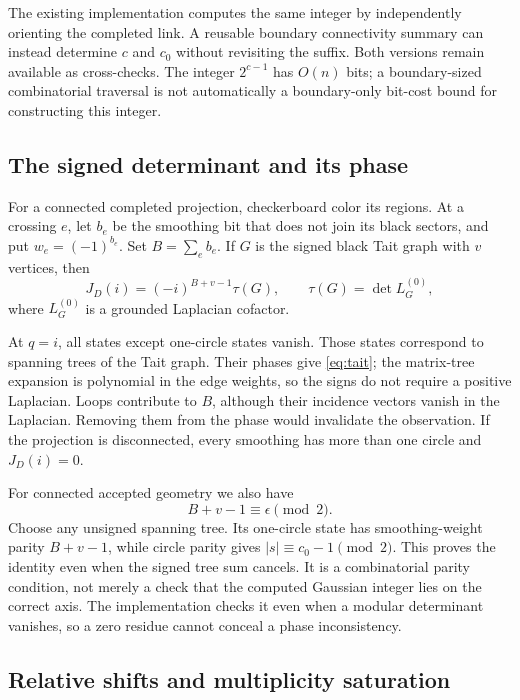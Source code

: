 The existing implementation computes the same integer by independently
orienting the completed link. A reusable boundary connectivity summary can
instead determine $c$ and $c_0$ without revisiting the suffix. Both versions
remain available as cross-checks. The integer $2^{c-1}$ has $O(n)$ bits; a
boundary-sized combinatorial traversal is not automatically a boundary-only
bit-cost bound for constructing this integer.

\subsection{The signed determinant and its phase}

For a connected completed projection, checkerboard color its regions. At a
crossing $e$, let $b_e$ be the smoothing bit that does not join its black
sectors, and put $w_e=(-1)^{b_e}$. Set $B=\sum_e b_e$. If $G$ is the signed
black Tait graph with $v$ vertices, then
\begin{equation}
 J_D(i)=(-i)^{B+v-1}\tau(G),\qquad
 \tau(G)=\det L_G^{(0)},
 \label{eq:tait}
\end{equation}
where $L_G^{(0)}$ is a grounded Laplacian cofactor.

At $q=i$, all states except one-circle states vanish. Those states correspond
to spanning trees of the Tait graph. Their phases give \cref{eq:tait}; the
matrix-tree expansion is polynomial in the edge weights, so the signs do not
require a positive Laplacian. Loops contribute to $B$, although their incidence
vectors vanish in the Laplacian. Removing them from the phase would invalidate
the observation. If the projection is disconnected, every smoothing has more
than one circle and $J_D(i)=0$.

For connected accepted geometry we also have
\[
                       B+v-1\equiv\epsilon\pmod2.
\]
Choose any unsigned spanning tree. Its one-circle state has smoothing-weight
parity $B+v-1$, while circle parity gives $|s|\equiv c_0-1\pmod2$.
This proves the identity even when the signed tree sum cancels.
It is a combinatorial parity condition, not merely a check that the computed
Gaussian integer lies on the correct axis. The implementation checks it even
when a modular determinant vanishes, so a zero residue cannot conceal a phase
inconsistency.

\subsection{Relative shifts and multiplicity saturation}

